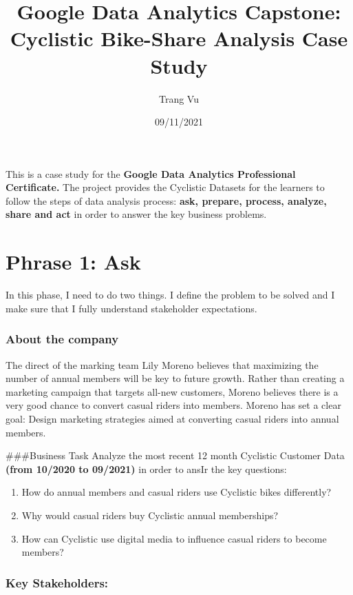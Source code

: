 \documentclass[
]{article}
\title{Google Data Analytics Capstone: Cyclistic Bike-Share Analysis
Case Study}
\author{Trang Vu}
\date{09/11/2021}
\providecommand{\tightlist}{%
  \setlength{\itemsep}{0pt}\setlength{\parskip}{0pt}}
\begin{document}
\maketitle

This is a case study for the \textbf{Google Data Analytics Professional
Certificate.} The project provides the Cyclistic Datasets for the
learners to follow the steps of data analysis process: \textbf{ask,
prepare, process, analyze, share and act} in order to answer the key
business problems.

\hypertarget{phrase-1-ask}{%
\section{Phrase 1: Ask}\label{phrase-1-ask}}

In this phase, I need to do two things. I define the problem to be
solved and I make sure that I fully understand stakeholder expectations.

\hypertarget{about-the-company}{%
\subsubsection{About the company}\label{about-the-company}}

The direct of the marking team Lily Moreno believes that maximizing the
number of annual members will be key to future growth. Rather than
creating a marketing campaign that targets all-new customers, Moreno
believes there is a very good chance to convert casual riders into
members. Moreno has set a clear goal: Design marketing strategies aimed
at converting casual riders into annual members.

\#\#\#Business Task Analyze the most recent 12 month Cyclistic Customer
Data \textbf{(from 10/2020 to 09/2021)} in order to ansIr the key
questions:

\begin{enumerate}
\def\labelenumi{\arabic{enumi}.}
\tightlist
\item
  How do annual members and casual riders use Cyclistic bikes
  differently?
\item
  Why would casual riders buy Cyclistic annual memberships?
\item
  How can Cyclistic use digital media to influence casual riders to
  become members?
\end{enumerate}

\hypertarget{key-stakeholders}{%
\subsubsection{Key Stakeholders:}\label{key-stakeholders}}
\end{document}
